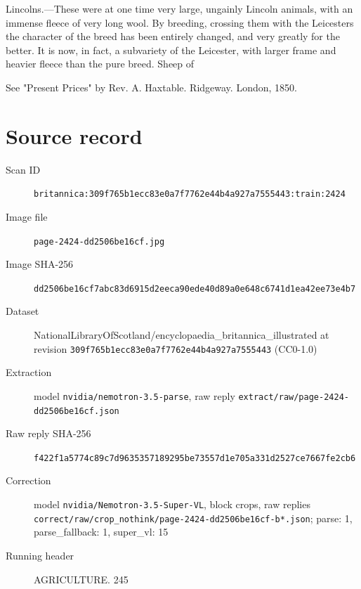 \documentclass{article}
\begin{document}
Lincolns.—These were at one time very large, ungainly Lincoln animals, with an immense fleece of very long wool. By breeding, crossing them with the Leicesters the character of the breed has been entirely changed, and very greatly for the better. It is now, in fact, a subvariety of the Leicester, with larger frame and heavier fleece than the pure breed. Sheep of

See "Present Prices" by Rev. A. Haxtable. Ridgeway. London, 1850.


\section*{Source record}
\begin{description}
\item[Scan ID] \texttt{britannica:309f765b1ecc83e0a7f7762e44b4a927a7555443:train:2424}
\item[Image file] \texttt{page-2424-dd2506be16cf.jpg}
\item[Image SHA-256] \texttt{dd2506be16cf7abc83d6915d2eeca90ede40d89a0e648c6741d1ea42ee73e4b7}
\item[Dataset] NationalLibraryOfScotland/encyclopaedia\_britannica\_illustrated at revision \texttt{309f765b1ecc83e0a7f7762e44b4a927a7555443} (CC0-1.0)
\item[Extraction] model \texttt{nvidia/nemotron-3.5-parse}, raw reply \texttt{extract/raw/page-2424-dd2506be16cf.json}
\item[Raw reply SHA-256] \texttt{f422f1a5774c89c7d9635357189295be73557d1e705a331d2527ce7667fe2cb6}
\item[Correction] model \texttt{nvidia/Nemotron-3.5-Super-VL}, block crops, raw replies \texttt{correct/raw/crop\_nothink/page-2424-dd2506be16cf-b*.json}; parse: 1, parse\_fallback: 1, super\_vl: 15
\item[Running header] AGRICULTURE. 245
\end{description}
\end{document}
